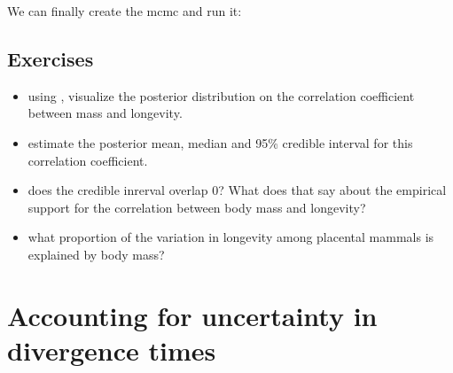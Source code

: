 We can finally create the mcmc and run it:
\\

\subsection*{Exercises}

\begin{itemize}
\item
using , visualize the posterior distribution on the correlation coefficient between mass and longevity.
\item
estimate the posterior mean, median and 95\% credible interval for this correlation coefficient.
\item
does the credible inrerval overlap 0? What does that say about the empirical support for the correlation between body mass and longevity?
\item
what proportion of the variation in longevity among placental mammals is explained by body mass?
\end{itemize}


\section{Accounting for uncertainty in divergence times}

